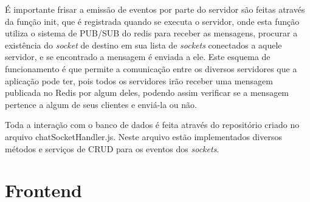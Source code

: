 É importante frisar a emissão de eventos por parte do servidor são feitas através da função init, que é registrada quando se executa o servidor, onde esta função utiliza o sistema de PUB/SUB do redis para receber as mensagens, procurar a existência do \textit{socket} de destino em sua lista de \textit{sockets} conectados a aquele servidor, e se encontrado a mensagem é enviada a ele. Este esquema de funcionamento é que permite a comunicação entre os diversos servidores que a aplicação pode ter, pois todos os servidores irão receber uma mensagem publicada no Redis por algum deles, podendo assim verificar se a mensagem pertence a algum de seus clientes e enviá-la ou não.

Toda a interação com o banco de dados é feita através do repositório criado no arquivo chatSocketHandler.js. Neste arquivo estão implementados diversos métodos e serviços de CRUD para os eventos dos \textit{sockets}.

\section{Frontend}


